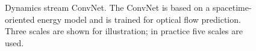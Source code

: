 \begin{figure}[t]
\begin{center}
\end{center}
\vspace{-0.45cm}
\caption[Dynamics stream ConvNet]{Dynamics stream ConvNet. The ConvNet is based on a
spacetime-oriented energy model
\cite{derpanis2012spacetime, simoncelli1998} and is trained
for optical flow prediction.
Three scales are shown for illustration;
in practice five scales are used.}
\label{fig:MSOE}
\end{figure}